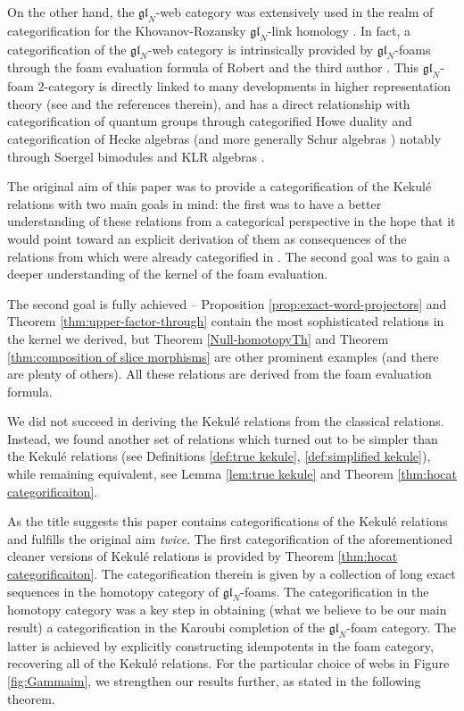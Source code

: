 \documentclass[12pt]{amsart}
\theoremstyle{definition}
\theoremstyle{remark}
\numberwithin{equation}{section}
\numberwithin{figure}{section}
\newcommand{\GL}{\mathfrak{gl}}
\begin{document}
On the other hand, the $\GL_N$-web category was extensively used in the realm of categorification for the Khovanov-Rozansky $\GL_N$-link homology \cite{KR2008, MSV2009}. In fact, a categorification of the $\GL_N$-web category is intrinsically provided by $\GL_N$-foams through the foam evaluation formula of Robert and the third author \cite{RW2020}. This $\GL_N$-foam 2-category is directly linked to many developments in higher representation theory (see \cite{goertz2026monoidal2categoriesfoamevaluation} and the references therein), and has a direct relationship with categorification of quantum groups  through categorified Howe duality \cite{QR2016} and categorification of Hecke algebras \cite{EliasThick} (and more generally Schur algebras \cite{MR2998837}) notably through Soergel bimodules \cite{Elias_2010} and KLR algebras \cite{Khovanov_2009, rouquier20082kacmoody}.

The original aim of this paper was to provide a categorification of the Kekulé relations with two main goals in mind: the first was to have a better understanding of these relations from a categorical perspective in the hope that it would point toward an explicit derivation of them as consequences of the relations from \cite{CKM2014}  
which were already categorified in \cite{RW2020}. The second goal was to gain a deeper understanding of the kernel of the foam evaluation.

The second goal is fully achieved -- Proposition \ref{prop:exact-word-projectors} and Theorem \ref{thm:upper-factor-through} contain the most sophisticated relations in the kernel we derived, but Theorem \ref{Null-homotopyTh} and Theorem \ref{thm:composition of slice morphisms} are other prominent examples (and there are plenty of others). All these relations are derived from the foam evaluation formula.

We did not succeed in deriving the Kekulé relations from the classical relations. Instead, we found another set of relations which turned out to be simpler than the Kekulé relations (see Definitions \ref{def:true kekule}, \ref{def:simplified kekule}), while remaining equivalent, see Lemma \ref{lem:true kekule} and Theorem \ref{thm:hocat categorificaiton}.

As the title suggests this paper contains categorifications of the Kekulé relations and fulfills the original aim \textit{twice}. The first categorification of the aforementioned cleaner versions of Kekulé relations is provided by Theorem \ref{thm:hocat categorificaiton}. The categorification therein is given by a collection of long exact sequences in the homotopy category of $\GL_N$-foams. The categorification in the homotopy category was a key step in obtaining (what we believe to be our main result) a categorification in the Karoubi completion of the $\GL_N$-foam category. The latter is achieved by explicitly constructing idempotents in the foam category, recovering all of the Kekulé relations. For the particular choice of webs in Figure \ref{fig:Gammaim}, we strengthen our results further, as stated in the following theorem.
\end{document}

